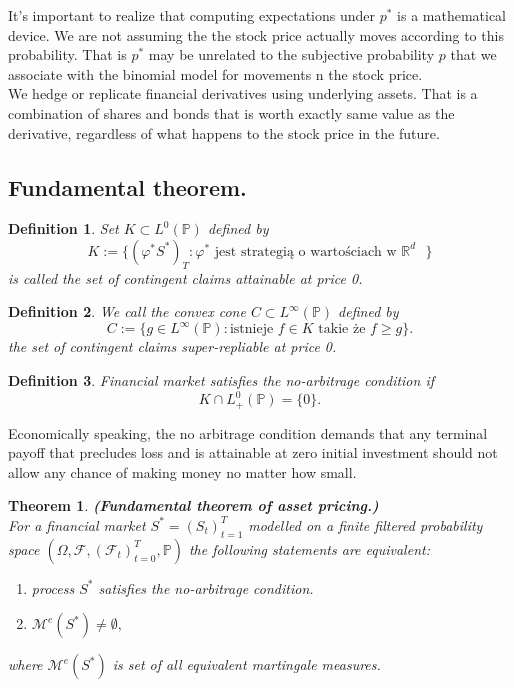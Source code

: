 \documentclass{book}
\newtheorem{definition}{Definition}[section]
\newtheorem{theorem}{Theorem}[section]
\begin{document}
It's important to realize that computing expectations under $p^{\ast}$ is a mathematical device. We are not assuming the the stock price actually moves according to this probability. That is $p^{\ast}$ may be unrelated to the subjective probability $p$ that we associate with the binomial model for movements n the stock price.\\
We hedge or replicate financial derivatives using underlying assets. That is a combination of shares and bonds that is worth exactly same value as the derivative, regardless of what happens to the stock price in the future.
\subsection{Fundamental theorem.}
\begin{definition}
Set $K\subset L^{0}(\mathbb{P})$ defined by
$$
K:=\{(\varphi^{\ast} S^{\ast})_{T}:\varphi^{\ast} \text{ jest strategią o wartościach w $\mathbb{R}^{d}$ }\}
$$
is called the set of contingent claims attainable at price 0.
\end{definition}
\begin{definition}
We call the convex cone $C\subset L^{\infty}(\mathbb{P})$ defined by
$$
C:=\{g\in L^{\infty}(\mathbb{P}): \text{istnieje $f\in K$ takie że $f\geq g$}\}.
$$
the set of contingent claims super-repliable at price 0.
\end{definition}

\begin{definition}
\label{python}
Financial market satisfies the no-arbitrage condition if
$$
K\cap L^{0}_{+}(\mathbb{P})=\{0\}.
$$
\end{definition}
Economically speaking, the no arbitrage condition demands that any terminal payoff that precludes loss and is attainable at zero initial investment should not allow any chance of making money no matter how small.
\begin{theorem}\textbf{(Fundamental theorem of asset pricing.)}\\
For a financial market $S^{\ast}=(S_{t})_{t=1}^{T}$ modelled on a finite filtered probability space $(\varOmega,\mathcal{F},(\mathcal{F}_{t})_{t=0}^{T},\mathbb{P})$ the following statements are equivalent:
\begin{enumerate}
\item [(i)] process $S^{\ast}$ satisfies the no-arbitrage condition.
\item [(ii)] $\mathcal{M}^{e}(S^{\ast})\neq\emptyset,$
\end{enumerate}
where $\mathcal{M}^{e}(S^{\ast})$ is set of all equivalent martingale measures.
\end{theorem}
\end{document}
